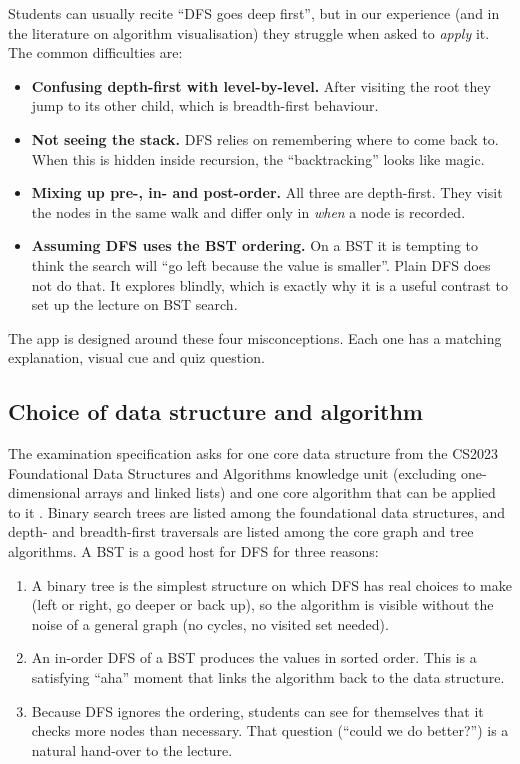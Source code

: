 \documentclass[11pt,a4paper]{article}
\begin{document}
Students can usually recite ``DFS goes deep first'', but in our experience (and in the
literature on algorithm visualisation) they struggle when asked to \emph{apply} it. The common
difficulties are:

\begin{itemize}
  \item \textbf{Confusing depth-first with level-by-level.} After visiting the root they jump
        to its other child, which is breadth-first behaviour.
  \item \textbf{Not seeing the stack.} DFS relies on remembering where to come back to. When
        this is hidden inside recursion, the ``backtracking'' looks like magic.
  \item \textbf{Mixing up pre-, in- and post-order.} All three are depth-first. They visit the
        nodes in the same walk and differ only in \emph{when} a node is recorded.
  \item \textbf{Assuming DFS uses the BST ordering.} On a BST it is tempting to think the search
        will ``go left because the value is smaller''. Plain DFS does not do that. It explores
        blindly, which is exactly why it is a useful contrast to set up the lecture on BST search.
\end{itemize}

The app is designed around these four misconceptions. Each one has a matching explanation,
visual cue and quiz question.

\subsection{Choice of data structure and algorithm}

The examination specification asks for one core data structure from the CS2023 Foundational Data
Structures and Algorithms knowledge unit (excluding one-dimensional arrays and linked lists) and
one core algorithm that can be applied to it \cite{cs2023}. Binary search trees are listed among
the foundational data structures, and depth- and breadth-first traversals are listed among the
core graph and tree algorithms. A BST is a good host for DFS for three reasons:

\begin{enumerate}
  \item A binary tree is the simplest structure on which DFS has real choices to make (left or
        right, go deeper or back up), so the algorithm is visible without the noise of a general
        graph (no cycles, no visited set needed).
  \item An in-order DFS of a BST produces the values in sorted order. This is a satisfying
        ``aha'' moment that links the algorithm back to the data structure.
  \item Because DFS ignores the ordering, students can see for themselves that it checks more
        nodes than necessary. That question (``could we do better?'') is a natural hand-over to
        the lecture.
\end{enumerate}
\end{document}

